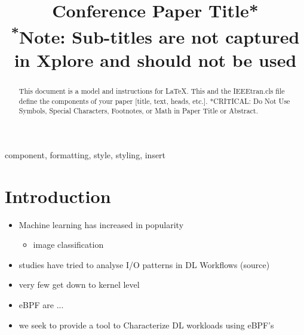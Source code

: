 \documentclass[conference]{IEEEtran}
\begin{document}
\title{Conference Paper Title*\\
{\footnotesize \textsuperscript{*}Note: Sub-titles are not captured in Xplore and
should not be used}
}

\author{
    \and
    \and
}

\maketitle

\begin{abstract}
    This document is a model and instructions for \LaTeX.
    This and the IEEEtran.cls file define the components of your paper [title, text, heads, etc.]. *CRITICAL: Do Not Use Symbols, Special Characters, Footnotes,
    or Math in Paper Title or Abstract.
\end{abstract}

\begin{IEEEkeywords}
    component, formatting, style, styling, insert
\end{IEEEkeywords}

\section{Introduction}
\begin{itemize}
    \item Machine learning has increased in popularity
    \begin{itemize}
        \item image classification
    \end{itemize}
    \item studies have tried to analyse I/O patterns in DL Workflows (source)
    \item very few get down to kernel level
    \item eBPF are ...
    \item we seek to provide a tool to Characterize DL workloads using eBPF's
\end{itemize}
\end{document}

